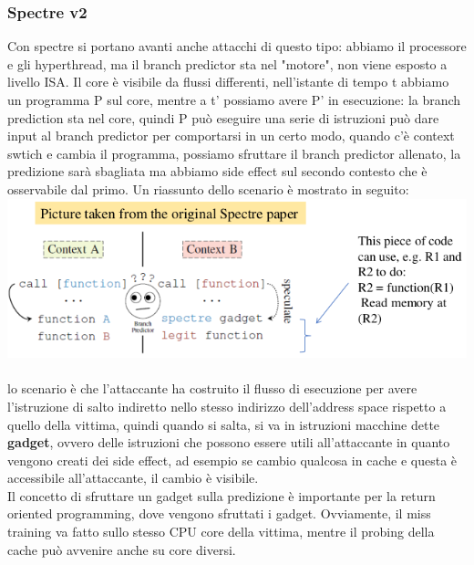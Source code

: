 \documentclass[14pt, oneside]{book}
\begin{document}
\subsubsection{Spectre v2}
Con spectre si portano avanti anche attacchi di questo tipo: abbiamo il processore e gli hyperthread, ma il branch predictor sta nel "motore", non viene esposto a livello ISA. Il core è visibile da flussi differenti, nell'istante di tempo t abbiamo un programma P sul core, mentre a t' possiamo avere P' in esecuzione: la branch prediction sta nel core, quindi P può eseguire una serie di istruzioni può dare input al branch predictor per comportarsi in un certo modo, quando c'è context swtich e cambia il programma, possiamo sfruttare il branch predictor allenato, la predizione sarà sbagliata ma abbiamo side effect sul secondo contesto che è osservabile dal primo. Un riassunto dello scenario è mostrato in seguito:\\
\includegraphics[scale=0.5]{immagini/spectrev2_branch_pred} \\\\
lo scenario è che l'attaccante ha costruito il flusso di esecuzione per avere l'istruzione di salto indiretto nello stesso indirizzo dell'address space rispetto a quello della vittima, quindi quando si salta, si va in istruzioni macchine dette \textbf{gadget}, ovvero delle istruzioni che possono essere utili all'attaccante in quanto vengono creati dei side effect, ad esempio se cambio qualcosa in cache e questa è accessibile all'attaccante, il cambio è visibile.\\ Il concetto di sfruttare un gadget sulla predizione è importante per la return oriented programming, dove vengono sfruttati i gadget. Ovviamente, il miss training va fatto sullo stesso CPU core della vittima, mentre il probing della cache può avvenire anche su core diversi.
\end{document}
